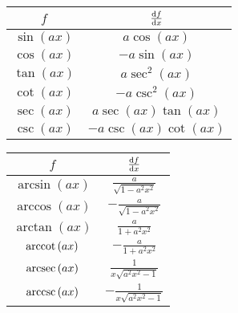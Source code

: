 \documentclass{article}
\begin{document}
\begin{table}[H]
    \renewcommand*{\arraystretch}{1.5}
    \centering
    \begin{tabular}{c c}
        \toprule
        \(f\)                       & \(\dv{f}{x}\)                                        \\
        \midrule
        \(\sin{\left( ax \right)}\) & \(a\cos{\left( ax \right)}\)                         \\
        \(\cos{\left( ax \right)}\) & \(-a\sin{\left( ax \right)}\)                        \\
        \(\tan{\left( ax \right)}\) & \(a\sec^2{\left( ax \right)}\)                       \\
        \(\cot{\left( ax \right)}\) & \(-a\csc^2{\left( ax \right)}\)                      \\
        \(\sec{\left( ax \right)}\) & \(a\sec{\left( ax \right)}\tan{\left( ax \right)}\)  \\
        \(\csc{\left( ax \right)}\) & \(-a\csc{\left( ax \right)}\cot{\left( ax \right)}\) \\[5pt]
        \bottomrule
    \end{tabular}
    \begin{tabular}{c c}
        \toprule
        \(f\)                          & \(\dv{f}{x}\)                                   \\
        \midrule
        \(\arcsin{\left( ax \right)}\) & \(\displaystyle  \frac{a}{\sqrt{1-a^2x^2}}\)    \\[8pt]
        \(\arccos{\left( ax \right)}\) & \(\displaystyle -\frac{a}{\sqrt{1-a^2x^2}}\)    \\[8pt]
        \(\arctan{\left( ax \right)}\) & \(\displaystyle  \frac{a}{1+a^2x^2}\)           \\[8pt]
        \(\arccot{\left( ax \right)}\) & \(\displaystyle -\frac{a}{1+a^2x^2}\)           \\[8pt]
        \(\arcsec{\left( ax \right)}\) & \(\displaystyle  \frac{1}{x\sqrt{a^2x^2 - 1}}\) \\[8pt]
        \(\arccsc{\left( ax \right)}\) & \(\displaystyle -\frac{1}{x\sqrt{a^2x^2 - 1}}\) \\[8pt]
        \bottomrule
    \end{tabular}
\end{table}
\end{document}
